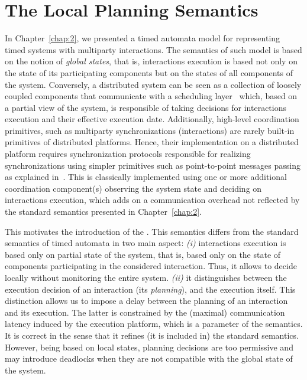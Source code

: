 \chapter{The Local Planning Semantics}\label{chap:5}
\minitoc
\label{sec3}

In Chapter~\ref{chap:2}, we presented a timed automata model for representing timed systems
with multiparty interactions. The semantics of such model is based on the notion of \emph{global
states}, that is, interactions execution is based not only on the state of its participating
components but on the states of all components of the system.
Conversely, a distributed system can be seen as a collection of loosely coupled
components that communicate with a scheduling layer~\cite{sch11,bip-par} which, based on
a partial view of the system, is responsible of taking decisions for interactions execution 
and their effective execution date. 
Additionally, high-level coordination primitives, such as multiparty synchronizations 
(interactions) are rarely built-in primitives of distributed platforms. 
Hence, their implementation on a distributed platform requires synchronization 
protocols responsible for realizing synchronizations using simpler primitives such as 
point-to-point messages passing as explained in~\cite{bip-par}. 
This is classically implemented using one or more additional 
coordination component(s) observing the system state and deciding on interactions execution,
which adds on a communication overhead not reflected by the standard semantics presented in
Chapter~\ref{chap:2}.

This motivates the introduction of the \emph{\lpsb}. This semantics differs from
the standard semantics of timed automata in two main aspect: \emph{(i)} interactions execution
is based only on partial state of the system, that is, based only on the state of components
participating in the considered interaction. Thus, it allows to decide locally without 
monitoring the entire system. \emph{(ii)} it distinguishes between the 
execution decision of an interaction (its \emph{planning}), and the execution itself.
This distinction allows us to impose a delay between the planning of an interaction and 
its execution. The latter is constrained by the (maximal) communication latency induced 
by the execution platform, which is a parameter of the semantics.
It is correct in the sense that it refines (it is included in) the standard semantics.
However, being based on local states, planning decisions are too permissive and may 
introduce deadlocks when they are not compatible with the global state of the system.

